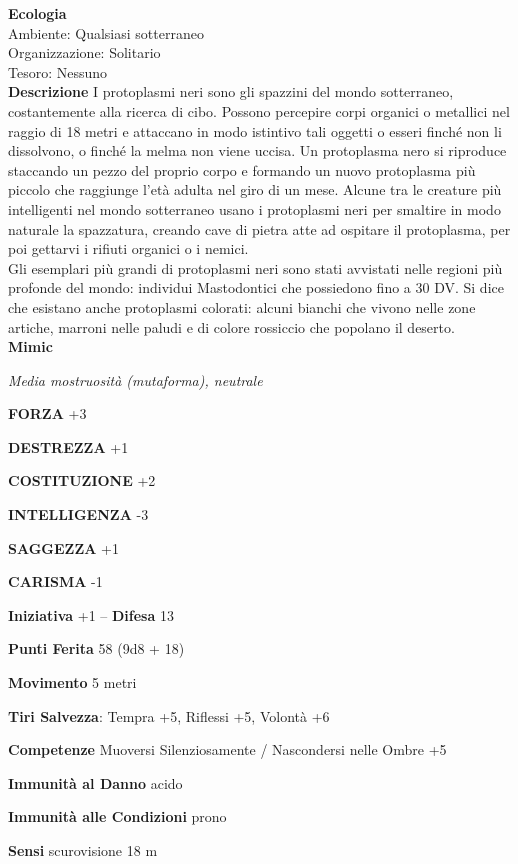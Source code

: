 \begin{multicols}{2}
\textbf{Ecologia}\\
Ambiente: Qualsiasi sotterraneo\\
Organizzazione: Solitario\\
Tesoro: Nessuno\\
\textbf{Descrizione}
I protoplasmi neri sono gli spazzini del mondo sotterraneo, costantemente alla ricerca di cibo. Possono percepire corpi organici o metallici nel raggio di 18 metri e attaccano in modo istintivo tali oggetti o esseri finché non li dissolvono, o finché la melma non viene uccisa. Un protoplasma nero si riproduce staccando un pezzo del proprio corpo e formando un nuovo protoplasma più piccolo che raggiunge l'età adulta nel giro di un mese. Alcune tra le creature più intelligenti nel mondo sotterraneo usano i protoplasmi neri per smaltire in modo naturale la spazzatura, creando cave di pietra atte ad ospitare il protoplasma, per poi gettarvi i rifiuti organici o i nemici.\\
Gli esemplari più grandi di protoplasmi neri sono stati avvistati nelle regioni più profonde del mondo: individui Mastodontici che possiedono fino a 30 DV. Si dice che esistano anche protoplasmi colorati: alcuni bianchi che vivono nelle zone artiche, marroni nelle paludi e di colore rossiccio che popolano il deserto.\\


\medskip{}\textbf{Mimic}

\emph{Media mostruosità (mutaforma), neutrale}

\textbf{FORZA} +3

\textbf{DESTREZZA} +1

\textbf{COSTITUZIONE} +2

\textbf{INTELLIGENZA} -3

\textbf{SAGGEZZA} +1

\textbf{CARISMA} -1

\textbf{Iniziativa} +1 -- \textbf{Difesa} 13

\textbf{Punti Ferita} 58 (9d8 + 18)

\textbf{Movimento} 5 metri

\textbf{Tiri Salvezza}: Tempra +5, Riflessi +5, Volontà +6

\textbf{Competenze} Muoversi Silenziosamente / Nascondersi nelle Ombre +5

\textbf{Immunità al Danno} acido

\textbf{Immunità alle Condizioni} prono

\textbf{Sensi} scurovisione 18 m


\end{multicols}

